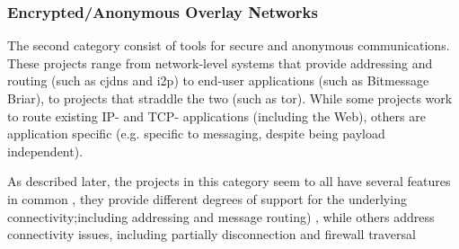 \documentclass{amsart}
\begin{document}
\subsubsection{Encrypted/Anonymous Overlay Networks}

The second category consist of tools for secure and anonymous communications.  These projects range from network-level systems that provide addressing and routing (such as cjdns and i2p) to end-user applications (such as Bitmessage Briar), to projects that straddle the two (such as tor). While some projects work to route existing IP- and TCP- applications (including the Web), others are application specific (e.g. specific to messaging, despite being payload independent).

As described later, the projects in this category seem to all have several features in common , they provide different degrees of support for the underlying connectivity;including addressing and message routing) , while others address connectivity issues, including partially disconnection and firewall traversal



\end{document}
